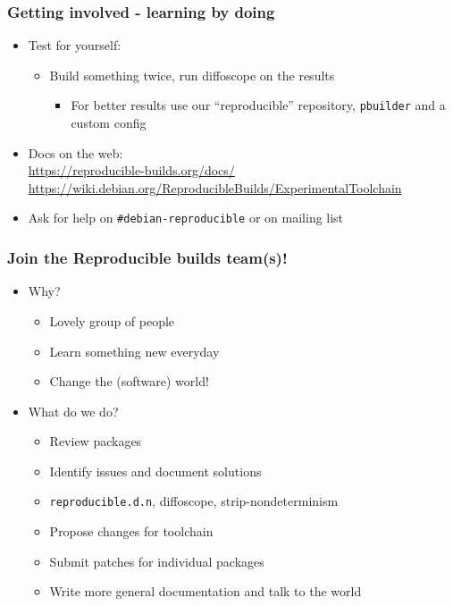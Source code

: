 \documentclass[14pt,aspectratio=169]{beamer}
\begin{document}
\begin{frame}
 \frametitle{Getting involved - learning by doing}

 \begin{itemize}
  \item Test for yourself:
   \begin{itemize}
    \item Build something twice, run diffoscope on the results
    \begin{itemize}
     \item For better results use our “reproducible” repository, \texttt{pbuilder} and a custom config
    \end{itemize}
   \end{itemize}
  \item Docs on the web: \\
    \small{\url{https://reproducible-builds.org/docs/}} \\
    \small{\url{https://wiki.debian.org/ReproducibleBuilds/ExperimentalToolchain}}
  \item Ask for help on \texttt{\#debian-reproducible} or on mailing list
 \end{itemize}
\end{frame}

\begin{frame}
 \frametitle{Join the Reproducible builds team(s)!}

 \begin{itemize}
  \item Why?
   \begin{itemize}
    \item \heartsuit{}\heartsuit{}\heartsuit{} Lovely group of people \heartsuit{}\heartsuit{}\heartsuit{}
    \item Learn something new everyday
    \item Change the (software) world!
   \end{itemize}
  \item What do we do?
   \begin{itemize}
    \item Review packages
    \item Identify issues and document solutions
    \item \texttt{reproducible.d.n}, diffoscope, strip-nondeterminism
    \item Propose changes for toolchain
    \item Submit patches for individual packages
    \item Write more general documentation and talk to the world
   \end{itemize}
 \end{itemize}
\end{frame}
\end{document}
